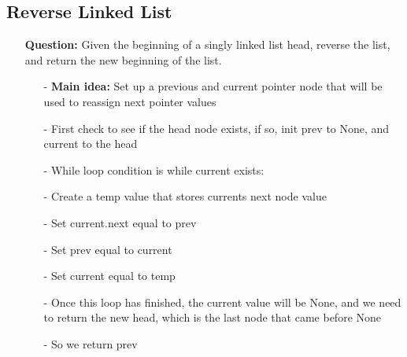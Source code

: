 \documentclass[12pt]{article}
\begin{document}
\subsection{Reverse Linked List}
\begin{enumerate}
  \item[] \textbf{Question:} Given the beginning of a singly linked list head, reverse the list, and return the new beginning of the list.

    \begin{enumerate}
      \item[-] \textbf{Main idea:} Set up a previous and current pointer node that will be used to reassign next pointer values
      \item[-] First check to see if the head node exists, if so, init prev to None, and current to the head 
      \item[-] While loop condition is while current exists: 
      \item[-] Create a temp value that stores currents next node value
      \item[-] Set current.next equal to prev 
      \item[-] Set prev equal to current 
      \item[-] Set current equal to temp
      \item[-] Once this loop has finished, the current value will be None, and we need to return the new head, which is the last node that came before None
      \item[-] So we return prev


    \end{enumerate}
\end{enumerate}
\end{document}

